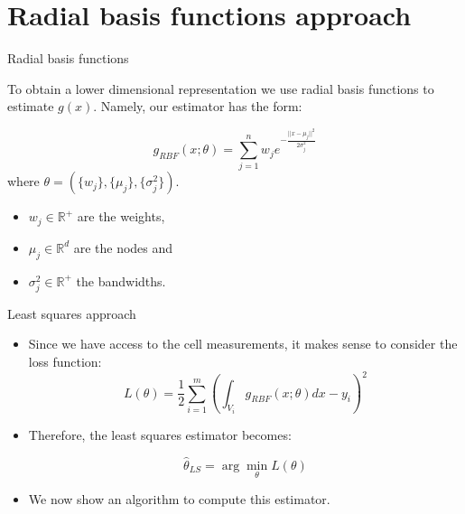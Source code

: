 \documentclass[aspectratio=169]{beamer}
\begin{document}
\section{Radial basis functions approach}

\begin{frame}{Radial basis functions}
	
	To obtain a lower dimensional representation we use \alert{radial basis functions} to estimate $g(x)$. Namely, our estimator has the form:

	\begin{equation*}
		g_{RBF} (x;\theta) = \sum_{j=1}^n w_j e^{-\frac{||x-\mu_j||^2}{2\sigma_j^2}}
	\end{equation*}
	where $\theta = (\{w_j\},\{\mu_j\},\{\sigma_j^2\})$.

	\vfill

	\begin{itemize}
		\item $w_j\in\mathbb{R^+}$ are the \alert{weights}, 
		\item $\mu_j\in\mathbb{R}^d$ are the \alert{nodes} and 
		\item $\sigma_j^2\in\mathbb{R}^+$ the \alert{bandwidths}.
	\end{itemize}


\end{frame}

\begin{frame}{Least squares approach}

	\begin{itemize}

		\item Since we have access to the cell measurements, it makes sense to consider the loss function:
		\begin{equation*}
			L(\theta) = \frac{1}{2}\sum_{i=1}^m \left(\int_{V_i} g_{RBF}(x;\theta) dx - y_i\right)^2
		\end{equation*}

		\item Therefore, the least squares estimator becomes:

		\begin{equation*}
			\hat{\theta}_{LS} = \arg\min_{\theta} L(\theta)
		\end{equation*}

		\item We now show an algorithm to compute this estimator.
	\end{itemize}
	
\end{frame}
\end{document}
